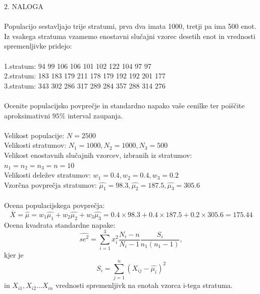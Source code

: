 \documentclass[a4paper]{article}
\begin{document}
\large{2. NALOGA}
\\ \\
Populacijo sestavljajo trije stratumi, prva dva imata 1000, tretji pa ima 500 enot. Iz vsakega stratuma vzamemo enostavni slučajni vzorec desetih enot in vrednosti spremenljivke pridejo:\\ \\
1.stratum: 94 99 106 106 101 102 122 104 97 97 \\
2.stratum: 183 183 179 211 178 179 192 192 201 177 \\
3.stratum: 343 302 286 317 289 284 357 288 314 276\\ \\
Ocenite populacijsko povprečje in standardno napako vaše cenilke ter poiščite aproksimativni $95\%$ interval zaupanja. \\ \\
Velikost populacije: $N = 2500$ \\
Velikosti stratumov: $N_1 = 1000, N_2 = 1000, N_3 = 500$  \\
Velikost enostavnih slučajnih vzorcev, izbranih iz stratumov: $n_1 = n_2 = n_3 = n = 10$ \\
Velikosti deležev stratumov: $w_1 = 0.4, w_2 = 0.4, w_3 = 0.2 $ \\
Vzorčna povprečja stratumov: $\hat{\mu_1} = 98.3,  \hat{\mu_2} = 187.5,  \hat{\mu_3} = 305.6$ \\ 
\\
Ocena populacijskega povprečja:
\begin{equation*}
\overline{X} = \hat{\mu} = w_1\hat{\mu_1} + w_2 \hat{\mu_2} + w_3 \hat{\mu_3} =  0.4 \times 98.3 + 0.4 \times 187.5 + 0.2 \times 305.6 = 175.44
\end{equation*}
Ocena kvadrata standardne napake:
 \begin{equation*}
\widehat{ se^2 }= \sum_{i=1}^{3} x_i^2 \frac{N_i-n}{N_i-1}\frac{S_i}{n_1(n_1-1)},
\end{equation*}
kjer je 
 \begin{equation*}
S_i = \sum_{j=1}^{n} (X_{ij} - \hat{\mu_i})^2 
\end{equation*}
in $X_{i1}, X_{i2} \ldots X_{in}$ vrednosti spremenljivk na enotah vzorca i-tega stratuma.
\end{document}
